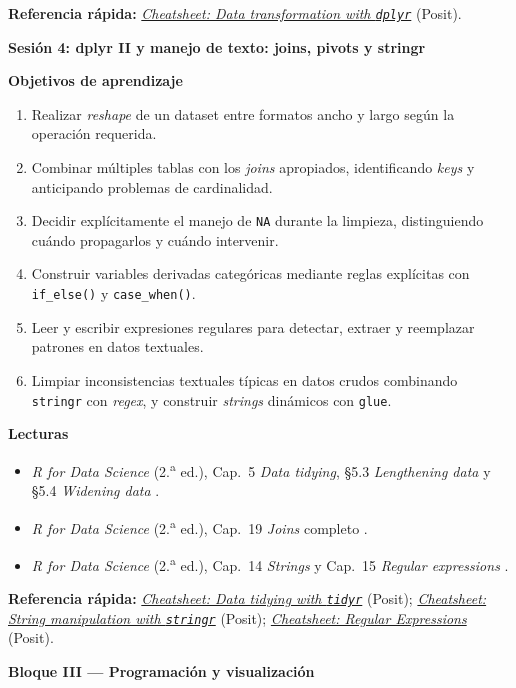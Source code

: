 \documentclass[11pt,letterpaper]{article}
\newcommand{\bloqueCurso}[1]{%
  \clearpage%
  \vspace*{0.5cm}%
  {\centering\color{main}\fontsize{26pt}{32pt}\selectfont\bfseries #1\par}%
  \vspace{0.8cm}%
}
\newcommand{\sesion}[2]{%
  \bigskip%
  {\color{main}\Large\bfseries Sesión #1: #2\par}%
  \smallskip%
}
\newcommand{\cheatsheet}[2]{%
  \href{https://rstudio.github.io/cheatsheets/#1.pdf}{\textit{Cheatsheet: #2}}%
}
\begin{document}
\medskip
\noindent\textbf{Referencia rápida:} \cheatsheet{data-transformation}{Data transformation with \texttt{dplyr}} (Posit).

\sesion{4}{dplyr II y manejo de texto: joins, pivots y stringr}
\medskip
\noindent\textbf{Objetivos de aprendizaje}
\begin{enumerate}[leftmargin=*, itemsep=1pt]
    \item Realizar \textit{reshape} de un dataset entre formatos ancho y largo según la operación requerida.
    \item Combinar múltiples tablas con los \textit{joins} apropiados, identificando \textit{keys} y anticipando problemas de cardinalidad.
    \item Decidir explícitamente el manejo de \texttt{NA} durante la limpieza, distinguiendo cuándo propagarlos y cuándo intervenir.
    \item Construir variables derivadas categóricas mediante reglas explícitas con \texttt{if\_else()} y \texttt{case\_when()}.
    \item Leer y escribir expresiones regulares para detectar, extraer y reemplazar patrones en datos textuales.
    \item Limpiar inconsistencias textuales típicas en datos crudos combinando \texttt{stringr} con \textit{regex}, y construir \textit{strings} dinámicos con \texttt{glue}.
\end{enumerate}

\medskip
\noindent\textbf{Lecturas}
\begin{itemize}[leftmargin=*, itemsep=1pt]
    \item \textit{R for Data Science} (2.\textsuperscript{a} ed.), Cap.\ 5 \textit{Data tidying}, §5.3 \textit{Lengthening data} y §5.4 \textit{Widening data} \cite{wickham2023r4ds}.
    \item \textit{R for Data Science} (2.\textsuperscript{a} ed.), Cap.\ 19 \textit{Joins} completo \cite{wickham2023r4ds}.
    \item \textit{R for Data Science} (2.\textsuperscript{a} ed.), Cap.\ 14 \textit{Strings} y Cap.\ 15 \textit{Regular expressions} \cite{wickham2023r4ds}.
\end{itemize}

\medskip
\noindent\textbf{Referencia rápida:} \cheatsheet{tidyr}{Data tidying with \texttt{tidyr}} (Posit); \cheatsheet{strings}{String manipulation with \texttt{stringr}} (Posit); \cheatsheet{regex}{Regular Expressions} (Posit).

\bloqueCurso{Bloque III --- Programación y visualización}
\end{document}
